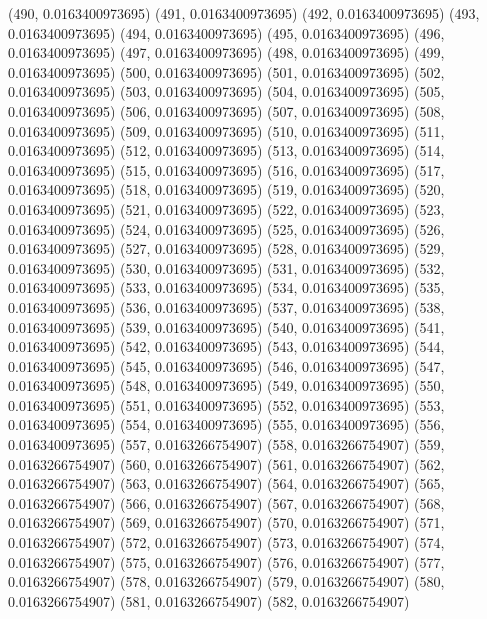 {					(490, 0.0163400973695)
					(491, 0.0163400973695)
					(492, 0.0163400973695)
					(493, 0.0163400973695)
					(494, 0.0163400973695)
					(495, 0.0163400973695)
					(496, 0.0163400973695)
					(497, 0.0163400973695)
					(498, 0.0163400973695)
					(499, 0.0163400973695)
					(500, 0.0163400973695)
					(501, 0.0163400973695)
					(502, 0.0163400973695)
					(503, 0.0163400973695)
					(504, 0.0163400973695)
					(505, 0.0163400973695)
					(506, 0.0163400973695)
					(507, 0.0163400973695)
					(508, 0.0163400973695)
					(509, 0.0163400973695)
					(510, 0.0163400973695)
					(511, 0.0163400973695)
					(512, 0.0163400973695)
					(513, 0.0163400973695)
					(514, 0.0163400973695)
					(515, 0.0163400973695)
					(516, 0.0163400973695)
					(517, 0.0163400973695)
					(518, 0.0163400973695)
					(519, 0.0163400973695)
					(520, 0.0163400973695)
					(521, 0.0163400973695)
					(522, 0.0163400973695)
					(523, 0.0163400973695)
					(524, 0.0163400973695)
					(525, 0.0163400973695)
					(526, 0.0163400973695)
					(527, 0.0163400973695)
					(528, 0.0163400973695)
					(529, 0.0163400973695)
					(530, 0.0163400973695)
					(531, 0.0163400973695)
					(532, 0.0163400973695)
					(533, 0.0163400973695)
					(534, 0.0163400973695)
					(535, 0.0163400973695)
					(536, 0.0163400973695)
					(537, 0.0163400973695)
					(538, 0.0163400973695)
					(539, 0.0163400973695)
					(540, 0.0163400973695)
					(541, 0.0163400973695)
					(542, 0.0163400973695)
					(543, 0.0163400973695)
					(544, 0.0163400973695)
					(545, 0.0163400973695)
					(546, 0.0163400973695)
					(547, 0.0163400973695)
					(548, 0.0163400973695)
					(549, 0.0163400973695)
					(550, 0.0163400973695)
					(551, 0.0163400973695)
					(552, 0.0163400973695)
					(553, 0.0163400973695)
					(554, 0.0163400973695)
					(555, 0.0163400973695)
					(556, 0.0163400973695)
					(557, 0.0163266754907)
					(558, 0.0163266754907)
					(559, 0.0163266754907)
					(560, 0.0163266754907)
					(561, 0.0163266754907)
					(562, 0.0163266754907)
					(563, 0.0163266754907)
					(564, 0.0163266754907)
					(565, 0.0163266754907)
					(566, 0.0163266754907)
					(567, 0.0163266754907)
					(568, 0.0163266754907)
					(569, 0.0163266754907)
					(570, 0.0163266754907)
					(571, 0.0163266754907)
					(572, 0.0163266754907)
					(573, 0.0163266754907)
					(574, 0.0163266754907)
					(575, 0.0163266754907)
					(576, 0.0163266754907)
					(577, 0.0163266754907)
					(578, 0.0163266754907)
					(579, 0.0163266754907)
					(580, 0.0163266754907)
					(581, 0.0163266754907)
					(582, 0.0163266754907)
}
